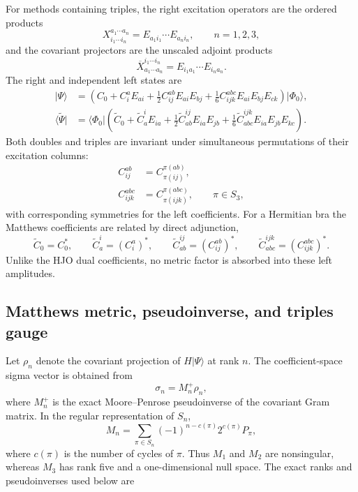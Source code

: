 \documentclass[10pt]{article}
\numberwithin{equation}{section}
\newcommand{\vac}{\Phi_0}
\begin{document}
For methods containing triples, the right excitation operators are the
ordered products
\begin{equation}
 X_{i_1\cdots i_n}^{a_1\cdots a_n}
 =E_{a_1i_1}\cdots E_{a_ni_n},
 \qquad n=1,2,3,
\end{equation}
and the covariant projectors are the unscaled adjoint products
\begin{equation}
 \overline X_{a_1\cdots a_n}^{i_1\cdots i_n}
 =E_{i_1a_1}\cdots E_{i_na_n}.
\end{equation}
The right and independent left states are
\begin{align}
 \lvert\Psi\rangle
 &=\left(
 C_0+C_i^aE_{ai}
 +\frac12C_{ij}^{ab}E_{ai}E_{bj}
 +\frac16C_{ijk}^{abc}E_{ai}E_{bj}E_{ck}
 \right)\lvert\vac\rangle,
 \\
 \langle\widetilde\Psi\rvert
 &=\langle\vac\rvert\left(
 \widetilde C_0+\widetilde C_a^iE_{ia}
 +\frac12\widetilde C_{ab}^{ij}E_{ia}E_{jb}
 +\frac16\widetilde C_{abc}^{ijk}E_{ia}E_{jb}E_{kc}
 \right).
\end{align}
Both doubles and triples are invariant under simultaneous permutations of
their excitation columns:
\begin{align}
 C_{ij}^{ab}&=C_{\pi(ij)}^{\pi(ab)},
 \\
 C_{ijk}^{abc}&=C_{\pi(ijk)}^{\pi(abc)},
 \qquad \pi\in S_3,
\end{align}
with corresponding symmetries for the left coefficients.  For a Hermitian
bra the Matthews coefficients are related by direct adjunction,
\begin{equation}
 \widetilde C_0=C_0^*,\qquad
 \widetilde C_a^i=(C_i^a)^*,\qquad
 \widetilde C_{ab}^{ij}=(C_{ij}^{ab})^*,\qquad
 \widetilde C_{abc}^{ijk}=(C_{ijk}^{abc})^*.
\end{equation}
Unlike the HJO dual coefficients, no metric factor is absorbed into these
left amplitudes.

\subsection{Matthews metric, pseudoinverse, and triples gauge}

Let $\rho_n$ denote the covariant projection of $H\lvert\Psi\rangle$ at
rank $n$.  The coefficient-space sigma vector is obtained from
\begin{equation}
 \sigma_n=M_n^+\rho_n,
\end{equation}
where $M_n^+$ is the exact Moore--Penrose pseudoinverse of the covariant
Gram matrix.  In the regular representation of $S_n$,
\begin{equation}
 M_n=\sum_{\pi\in S_n}(-1)^{n-c(\pi)}2^{c(\pi)}P_\pi,
\end{equation}
where $c(\pi)$ is the number of cycles of $\pi$.  Thus $M_1$ and $M_2$ are
nonsingular, whereas $M_3$ has rank five and a one-dimensional null space.
The exact ranks and pseudoinverses used below are
\end{document}
